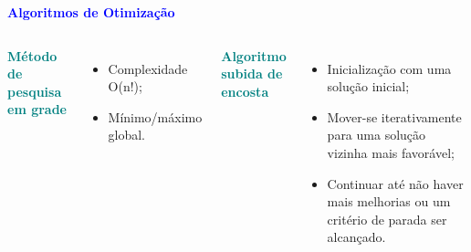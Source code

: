 \documentclass[aspectratio=169]{beamer}
\begin{document}
\begin{frame}{\textcolor{blue}{\textbf{Algoritmos de Otimização}}}

\begin{columns}
\textcolor{teal}{\textbf{Método de pesquisa em grade}}

\begin{itemize}[label={}]
	\item Complexidade O(n!);
	\item Mínimo/máximo global.
\end{itemize}


 

\vspace*{-3.05cm}

\textcolor{teal}{\textbf{Algoritmo subida de encosta}}
\begin{itemize}[label={}]
	\item Inicialização com uma solução inicial;
	\item \justifying Mover-se iterativamente para uma solução vizinha mais favorável;
	\item \justifying Continuar até não haver mais melhorias ou um critério de parada ser alcançado.
\end{itemize}

\end{columns}

\end{frame}
\end{document}
